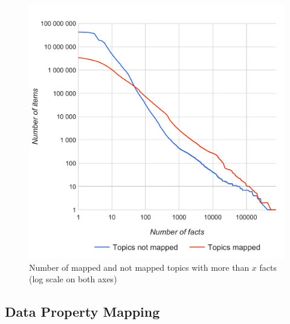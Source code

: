 \documentclass{sig-alternate}
\begin{document}
\begin{figure}[!htbp]
\centering
\includegraphics[width=8.45 cm]{img/facts-topics-mapping.pdf}
\caption{Number of mapped and not mapped topics with more than $x$ facts (log scale on both axes)}
\end{figure}

\subsection{Data Property Mapping}
\end{document}
